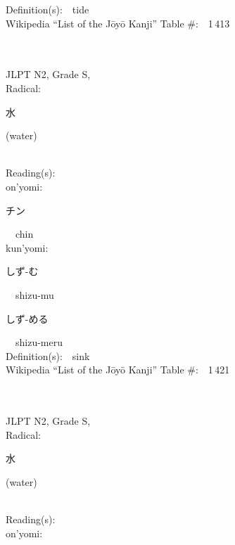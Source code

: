 \begin{multicols}{2}
Definition(s):\ \ tide \\
Wikipedia ``List of the J\=oy\=o Kanji'' Table \#:\ \ 1\,413 \\
\ \ \\
{\fontsize{34pt}{40pt}  }\ \ \\  %
{JLPT N2, Grade S, \\Radical:\ \ {\begin{CJK}{UTF8}{min} 水 \end{CJK}} (water) } \\
Reading(s):\ \ \\
{\hspace*{1em}}on'yomi:\ \ \\
{\hspace*{2em}}{\begin{CJK}{UTF8}{min} チン \end{CJK}}\ \ chin\ \ \\
{\hspace*{1em}}kun'yomi:\ \ \\
{\hspace*{2em}}{\begin{CJK}{UTF8}{min} しず-む \end{CJK}}\ \ shizu-mu\ \ \\
{\hspace*{2em}}{\begin{CJK}{UTF8}{min} しず-める \end{CJK}}\ \ shizu-meru\ \ \\
Definition(s):\ \ sink \\
Wikipedia ``List of the J\=oy\=o Kanji'' Table \#:\ \ 1\,421 \\
\ \ \\
{\fontsize{34pt}{40pt}  }\ \ \\  %
{JLPT N2, Grade S, \\Radical:\ \ {\begin{CJK}{UTF8}{min} 水 \end{CJK}} (water) } \\
Reading(s):\ \ \\
{\hspace*{1em}}on'yomi:\ \ \\

\end{multicols}
